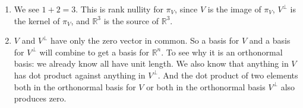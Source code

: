 \begin{SaveQuestion}
\begin{enumerate}
        \item We see $1 + 2  = 3$. This is rank nullity for $\pi_V$, since $V$ is the image of $\pi_V$, $V^{\perp}$ is the kernel of $\pi_V$, and $\mathbb{R}^3$ is the source of $\mathbb{R}^3$.
        \item $V$ and $V^{\perp}$ have only the zero vector in common. So a basis for $V$ and a basis for $V^{\perp}$ will combine to get a basis for $ \mathbb{R}^n$. 
					To see why it is an orthonormal basis: we already know all have unit length. We also know that anything in $V$ has dot product against anything in $V^{\perp}$. And the dot product of two elements both in the orthonormal basis for  $V$ or both in  the orthonormal basis $V^{\perp}$ also produces zero.
    \end{enumerate}
\end{SaveQuestion}


